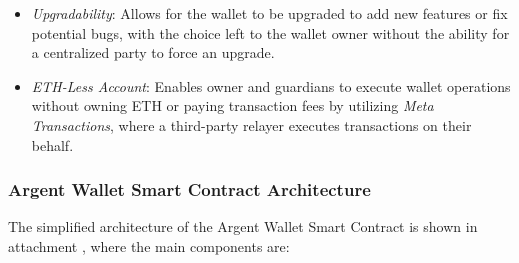 \begin{itemize}
    \item \textit{Upgradability}: Allows for the wallet to be upgraded to add new features or fix potential bugs, with the choice left to the wallet owner without the ability for a centralized party to force an upgrade.
    \item \textit{ETH-Less Account}: Enables owner and guardians to execute wallet operations without owning ETH or paying transaction fees by utilizing \textit{Meta Transactions}, where a third-party relayer executes transactions on their behalf.
    \end{itemize}
    
\subsubsection{Argent Wallet Smart Contract Architecture}

The simplified architecture of the Argent Wallet Smart Contract is shown in attachment , where the main components are: \cite{argent-smart-wallet-specifications}

